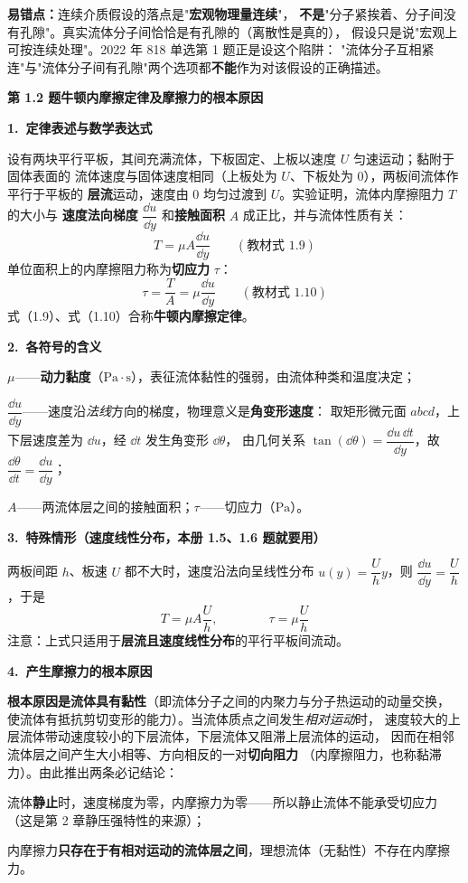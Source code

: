 \begin{yicuo}
\textbf{易错点：}连续介质假设的落点是"\textbf{宏观物理量连续}"，
\textbf{不是}"分子紧挨着、分子间没有孔隙"。真实流体分子间恰恰是有孔隙的（离散性是真的），
假设只是说"宏观上可按连续处理"。2022 年 818 单选第 1 题正是设这个陷阱：
"流体分子互相紧连"与"流体分子间有孔隙"两个选项都\textbf{不能}作为对该假设的正确描述。
\end{yicuo}

\noindent\textbf{第 1.2 题\quad 牛顿内摩擦定律及摩擦力的根本原因}

\begin{jie}
\textbf{1.\ 定律表述与数学表达式}

设有两块平行平板，其间充满流体，下板固定、上板以速度 $U$ 匀速运动；黏附于固体表面的
流体速度与固体速度相同（上板处为 $U$、下板处为 $0$），两板间流体作平行于平板的
\textbf{层流}运动，速度由 $0$ 均匀过渡到 $U$。实验证明，流体内摩擦阻力 $T$ 的大小与
\textbf{速度法向梯度} $\dfrac{\dd u}{\dd y}$ 和\textbf{接触面积} $A$ 成正比，并与流体性质有关：
\[ T=\mu A\frac{\dd u}{\dd y}\qquad(\text{教材式 1.9}) \]
单位面积上的内摩擦阻力称为\textbf{切应力} $\tau$：
\[ \tau=\frac{T}{A}=\mu\frac{\dd u}{\dd y}\qquad(\text{教材式 1.10}) \]
式（1.9）、式（1.10）合称\textbf{牛顿内摩擦定律}。

\textbf{2.\ 各符号的含义}
\begin{xiaowen}
\item $\mu$——\textbf{动力黏度}（$\mathrm{Pa\cdot s}$），表征流体黏性的强弱，由流体种类和温度决定；
\item $\dfrac{\dd u}{\dd y}$——速度沿\emph{法线}方向的梯度，物理意义是\textbf{角变形速度}：
取矩形微元面 $abcd$，上下层速度差为 $\dd u$，经 $\dd t$ 发生角变形 $\dd\theta$，
由几何关系 $\tan(\dd\theta)=\dfrac{\dd u\,\dd t}{\dd y}$，故
$\dfrac{\dd\theta}{\dd t}=\dfrac{\dd u}{\dd y}$；
\item $A$——两流体层之间的接触面积；$\tau$——切应力（$\mathrm{Pa}$）。
\end{xiaowen}

\textbf{3.\ 特殊情形（速度线性分布，本册 1.5、1.6 题就要用）}

两板间距 $h$、板速 $U$ 都不大时，速度沿法向呈线性分布 $u(y)=\dfrac{U}{h}y$，则
$\dfrac{\dd u}{\dd y}=\dfrac{U}{h}$，于是
\[ T=\mu A\frac{U}{h},\qquad\qquad \tau=\mu\frac{U}{h} \]
注意：上式只适用于\textbf{层流且速度线性分布}的平行平板间流动。

\textbf{4.\ 产生摩擦力的根本原因}

\textbf{根本原因是流体具有黏性}（即流体分子之间的内聚力与分子热运动的动量交换，
使流体有抵抗剪切变形的能力）。当流体质点之间发生\emph{相对运动}时，
速度较大的上层流体带动速度较小的下层流体，下层流体又阻滞上层流体的运动，
因而在相邻流体层之间产生大小相等、方向相反的一对\textbf{切向阻力}
（内摩擦阻力，也称黏滞力）。由此推出两条必记结论：
\begin{xiaowen}
\item 流体\textbf{静止}时，速度梯度为零，内摩擦力为零——所以静止流体不能承受切应力
（这是第 2 章静压强特性的来源）；
\item 内摩擦力\textbf{只存在于有相对运动的流体层之间}，理想流体（无黏性）不存在内摩擦力。
\end{xiaowen}
\end{jie}

